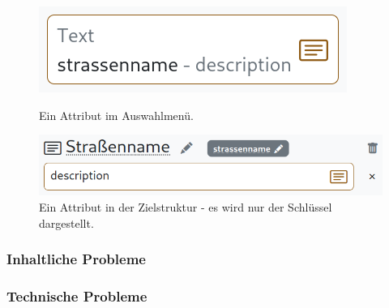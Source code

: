 \begin{figure}[!ht]
  \includegraphics[width=\linewidth]{assets/attribute-source.png}
  \caption{Ein Attribut im Auswahlmenü.}
  \label{fig:attribute-source}
  \endminipage
  \hfill
  \includegraphics[width=\linewidth]{assets/attribute-target.png}
  \caption{Ein Attribut in der Zielstruktur - es wird nur der Schlüssel dargestellt.}
  \label{fig:attribute-target}
  \endminipage
\end{figure}


\subsubsection{Inhaltliche Probleme}


\subsubsection{Technische Probleme}


